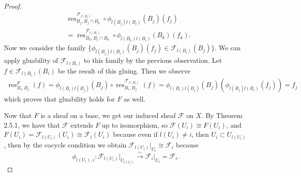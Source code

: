 \documentclass{article}
\newcommand{\fF}{\mathscr{F}}
\DeclareMathOperator{\res}{res}
\begin{document}
\begin{proof}
         \begin{align*}
             & \res_{B_j,B_j\cap B_k}^{\fF_{l(B_i)}}\circ\phi_{l(B_j)l(B_i)}(B_j)(f_j)\\
            &= \res_{B_k,B_j\cap B_k}^{\fF_{l(B_i)}}\circ \phi_{l(B_k)l(B_i)}(B_k)(f_k).
         \end{align*}
    Now we consider the family $\{\phi_{l(B_j)l(B_i)}(B_j)(f_j)\in \fF_{l(B_i)}(B_j)\}$. We can apply gluability of $\fF_{l(B_i)}$ to this family by the previous observation. Let $f\in \fF_{l(B_i)}(B_i)$ be the result of this gluing. Then we observe
    \begin{align*}
        \res_{B_i,B_j}^F(f)=\phi_{l(B_i)l(B_j)}(B_j)\circ \res_{B_i,B_j}^{\fF_{l(B_i)}}(f)=\phi_{l(B_i)l(B_j)}(B_j)(\phi_{l(B_j)l(B_i)}(f_j))=f_j
    \end{align*}
    which proves that gluability holds for $F$ as well.

    \vspace{0.1in}
    Now that $F$ is a sheaf on a base, we get our induced sheaf $\fF$ on $X$. By Theorem 2.5.1, we have that $\fF$ extends $F$ up to isomorphism, so $\fF(U_i)\cong F(U_i)$, and $F(U_i)=\fF_{l(U_i)}(U_i)\cong \fF_i(U_i)$ because even if $l(U_i)\ne i$, then $U_i\subset U_{l(U_i)}$, then by the cocycle condition we obtain $\fF_{l(U_i)}\vert_{U_i}\cong \fF_i$ because
    \[
    \phi_{l(U_i),i}:\fF_{l(U_i)}\vert_{U_{l(U_i)}} \xrightarrow{\sim} \fF_i\vert_{U_i}=\fF_i.
    \]
\end{proof}
\subsection{}
\end{document}
